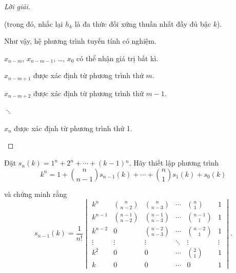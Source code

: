 \begin{proof}[Lời giải]
\begin{enumerate}[label = \textbf{Trường hợp \arabic*.},itemindent=2cm]
              (trong đó, nhắc lại $h_{k}$ là đa thức đối xứng thuần nhất đầy đủ bậc $k$).
              
              Như vậy, hệ phương trình tuyến tính có nghiệm.
              
              $x_{n-m}$, $x_{n-m-1}$, \ldots, $x_{0}$ có thể nhận giá trị bất kì.
              
              $x_{n-m+1}$ được xác định từ phương trình thứ $m$.
              
              $x_{n-m+2}$ được xác định từ phương trình thứ $m-1$.
              
              $\ddots$
              
              $x_{n}$ được xác định từ phương trình thứ 1.
    \end{enumerate}
\end{proof}

\begin{exercise}
    Đặt $s_{n}(k) = 1^{n} + 2^{n} + \cdots + (k-1){}^{n}$. Hãy thiết lập phương trình
    \[
        k^{n} = 1 + \binom{n}{n-1}s_{n-1}(k) + \cdots + \binom{n}{1}s_{1}(k) + s_{0}(k)
    \]
    
    và chứng minh rằng
    \[
        s_{n-1}(k) = \frac{1}{n!}
        \begin{vmatrix}
            k^{n}   & \binom{n}{n-2}   & \binom{n}{n-3}   & \cdots & \binom{n}{1}   & 1      \\
            k^{n-1} & \binom{n-1}{n-2} & \binom{n-1}{n-3} & \cdots & \binom{n-1}{1} & 1      \\
            k^{n-2} & 0                & \binom{n-2}{n-3} & \cdots & \binom{n-2}{1} & 1      \\
            \vdots  & \vdots           & \vdots           & \ddots & \vdots         & \vdots \\
            k^{2}   & 0                & 0                & \cdots & \binom{2}{1}   & 1      \\
            k       & 0                & 0                & \cdots & 0              & 1
        \end{vmatrix}.
    \]
\end{exercise}

